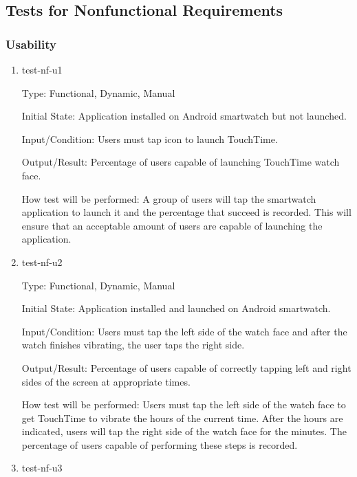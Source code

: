 \subsection{Tests for Nonfunctional Requirements}

\subsubsection{Usability}

\begin{enumerate}

\item{test-nf-u1\\}

Type: Functional, Dynamic, Manual
					
Initial State: Application installed on Android smartwatch but not launched.
					
Input/Condition: Users must tap icon to launch TouchTime.
					
Output/Result: Percentage of users capable of launching TouchTime watch face.
					
How test will be performed: A group of users will tap the smartwatch application to launch it and the percentage that succeed is recorded. This will ensure that an acceptable amount of users are capable of launching the application.
					
\item{test-nf-u2\\}

Type: Functional, Dynamic, Manual
					
Initial State: Application installed and launched on Android smartwatch. 
					
Input/Condition: Users must tap the left side of the watch face and after the watch finishes vibrating, the user taps the right side.
					
Output/Result: Percentage of users capable of correctly tapping left and right sides of the screen at appropriate times.
					
How test will be performed: Users must tap the left side of the watch face to get TouchTime to vibrate the hours of the current time. After the hours are indicated, users will tap the right side of the watch face for the minutes. The percentage of users capable of performing these steps is recorded. 

\item{test-nf-u3\\}


\end{enumerate}
